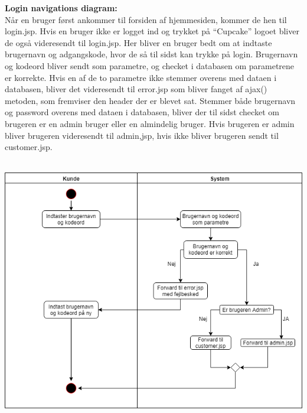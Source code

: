 \documentclass[11pt]{report}
\begin{document}
\noindent
\textbf{Login navigations diagram:}\\
Når en bruger først ankommer til forsiden af hjemmesiden, kommer de hen til login.jsp. Hvis en bruger ikke er logget ind og trykket på “Cupcake” logoet bliver de også videresendt til login.jsp. Her bliver en bruger bedt om at indtaste brugernavn og adgangskode, hvor de så til sidst kan trykke på login. Brugernavn og kodeord bliver sendt som parametre, og checket i databasen om parametrene er korrekte. Hvis en af de to parametre ikke stemmer overens med dataen i databasen, bliver det videresendt til error.jsp som bliver fanget af ajax() metoden, som fremviser den header der er blevet sat. Stemmer både brugernavn og password overens med dataen i databasen, bliver der til sidst checket om brugeren er en admin bruger eller en almindelig bruger. Hvis brugeren er admin bliver brugeren videresendt til admin,jsp, hvis ikke bliver brugeren sendt til customer.jsp.\\\\
\begin{center}
\includegraphics[width=15cm]{LoginCupCake.png}
\end{center}
\newpage
\end{document}

